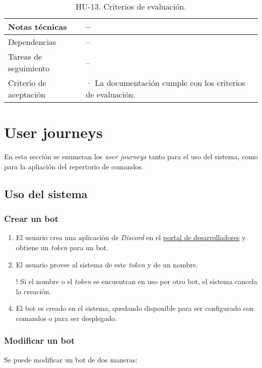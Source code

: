 \begin{table}[H]
\begin{adjustbox}{max width=\textwidth}
\begin{tabularx}{\textwidth}{|l|L|}
        Notas técnicas & – \\ \hline
        Dependencias & – \\ \hline
        Tareas de seguimiento & – \\ \hline
        Criterio de aceptación & · La documentación cumple con los criterios de evaluación. \\ \hline
    \end{tabularx}
    \end{adjustbox}
    \caption{HU-13. Criterios de evaluación.}
\end{table}
 
\section{User journeys}

En esta sección se enumeran los \textit{user journeys} tanto para el uso del sistema, como para la apliación del repertorio de comandos.

\subsection{Uso del sistema}

\subsubsection{Crear un bot}

\begin{enumerate}
	\item El usuario crea una aplicación de \textit{Discord} en el \href{https://discord.com/developers/applications}{portal de desarrolladores} y obtiene un \textit{token} para un bot.
	\item El usuario provee al sistema de este \textit{token} y de un nombre.
	\item[!] Si el nombre o el \textit{token} se encuentran en uso por otro bot, el sistema cancela la creación.
	\item El bot es creado en el sistema, quedando disponible para ser configurado con comandos o para ser desplegado.
\end{enumerate}

\subsubsection{Modificar un bot}

Se puede modificar un bot de dos maneras:

